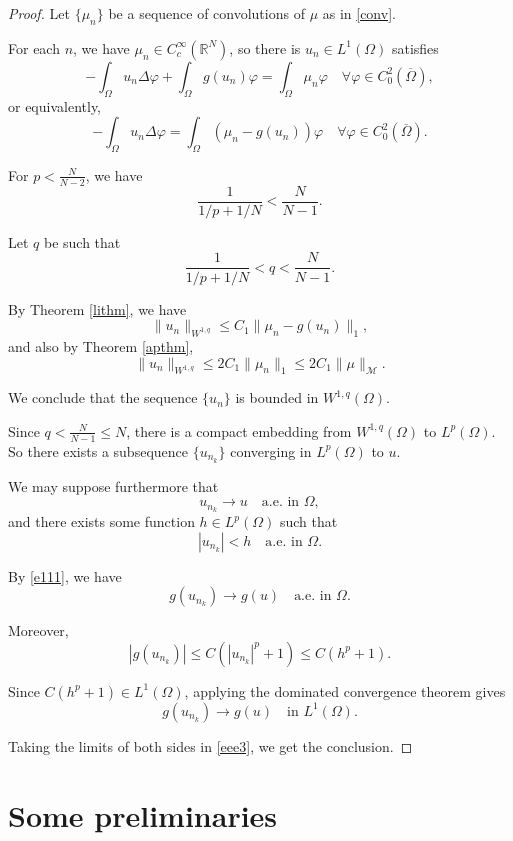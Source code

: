 \documentclass[a4paper, 11pt]{report}
\theoremstyle{definition}\newtheorem*{rmk}{Remark}
\begin{document}
\begin{proof}
\mbox{}

Let $\{\mu_n\}$ be a sequence of convolutions of $\mu$ as in \eqref{conv}.

For each $n$, we have $\mu_n \in C_c^{\infty}(\mathbb{R}^N)$, so there is $u_n\in L^1(\Omega)$ satisfies
\begin{equation}\label{eee3}
-\int_{\Omega}u_n\Delta\varphi + \int_{\Omega}g(u_n)\varphi = \int_{\Omega}\mu_n \varphi\quad \forall \varphi\in C^2_0(\overline{\Omega}),
\end{equation}
or equivalently,
\[
-\int_{\Omega}u_n\Delta\varphi = \int_{\Omega}(\mu_n - g(u_n)) \varphi\quad \forall \varphi\in C^2_0(\overline{\Omega}).
\]

For $p < \frac{N}{N-2}$, we have 
\[
\frac{1}{1/p + 1/N} <  \frac{N}{N-1}.
\]

Let $q$ be such that 
\[
\frac{1}{1/p + 1/N} < q < \frac{N}{N-1}.
\]

By Theorem \ref{lithm}, we have
\[
\| u_n \|_{W^{1,q}} \le C_1\| \mu_n - g(u_n) \|_1,
\]
and also by Theorem \ref{apthm},
\[
\| u_n \|_{W^{1,q}} \le 2C_1\| \mu_n \|_1 \le 2C_1\| \mu \|_{\mathcal{M}}.
\]

We conclude that the sequence $\{u_n\}$ is bounded in $W^{1,q}(\Omega)$.

Since $q < \frac{N}{N-1}\le N$, there is a compact embedding from $W^{1,q}(\Omega)$ to $L^p(\Omega)$. So there exists a subsequence $\{u_{n_k}\}$ converging in $L^p(\Omega)$ to $u$. 

We may suppose furthermore that
\begin{equation}\label{e111}
u_{n_k} \to u \quad\text{a.e.\ in } \Omega,
\end{equation}
and there exists some function $h\in L^p(\Omega)$ such that
\[
|u_{n_k}| < h \quad \text{a.e.\ in }\Omega.
\]

By \eqref{e111}, we have
\[
g(u_{n_k}) \to g(u) \quad \text{a.e.\ in } \Omega.
\]

Moreover,
\[
|g(u_{n_k})| \le C(|u_{n_k}|^p + 1) \le C(h^p + 1).
\]

Since $C(h^p + 1) \in L^1(\Omega)$, applying the dominated convergence theorem gives
\[
g(u_{n_k}) \to g(u) \quad \text{in } L^1(\Omega).
\]

Taking the limits of both sides in \eqref{eee3}, we get the conclusion.
\end{proof}

\chapter{Some preliminaries}
\end{document}
